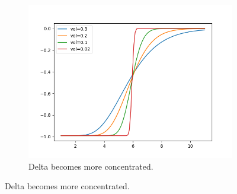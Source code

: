 \documentclass{article}
\begin{document}
\begin{theorem}
\begin{figure}[H]
\begin{subfigure}[b]{0.48\textwidth}
          \includegraphics[width=\textwidth]{img/delta_put_wrt_vol.png}
          \caption{Delta becomes more concentrated. }
          \label{fig:delta_put_wrt_vol}
        \end{subfigure}
        \label{fig:delta_wrt_vol}
      \end{figure}
    \end{theorem}
\end{document}
